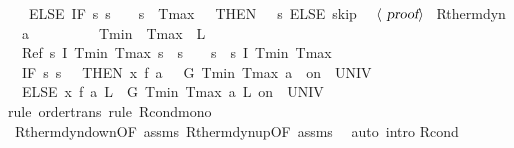 \documentclass[envcountsame,envcountsect]{llncs}
\begin{document}
\begin{example}
\begin{isabellebody}
\ \ \ ELSE\ IF\ {\isacharparenleft}{\isasymlambda}s{\isachardot}\ s{\isachardollar}{}\ {\isacharequal}\ {}\ {\isasymand}\ s{\isachardollar}{}\ {\isasymge}\ Tmax\ {\isacharminus}\ {}{\isacharparenright}\ THEN\ {\isacharparenleft}{}\ {\isacharcolon}{\isacharcolon}{\isacharequal}\ {\isacharparenleft}{\isasymlambda}s{\isachardot}{}{\isacharparenright}{\isacharparenright}\ ELSE\ skip{\isacharparenright}{\isachardoublequoteclose}\isanewline
\ \ $\langle \isa{proof}\rangle$\isanewline
\isanewline
{}\isamarkupfalse%
\ R{\isacharunderscore}therm{\isacharunderscore}dyn{\isacharcolon}\isanewline
\ \ {\isachardoublequoteopen}a\ {\isachargreater}\ {}{\isachardoublequoteclose}\ \ {\isachardoublequoteopen}{}\ {\isasymle}\ {\isasymtau}{\isachardoublequoteclose}\ \ {\isachardoublequoteopen}{}\ {\isacharless}\ Tmin{\isachardoublequoteclose}\ \ {\isachardoublequoteopen}Tmax\ {\isacharless}\ L{\isachardoublequoteclose}\isanewline
\ \ {\isachardoublequoteopen}Ref\ {\isasymlceil}{\isasymlambda}s{\isachardot}\ I\ Tmin\ Tmax\ s\ {\isasymand}\ s{\isachardollar}{}\ {\isacharequal}\ {}\ {\isasymand}\ s{\isachardollar}{}\ {\isacharequal}\ s{\isachardollar}{}{\isasymrceil}\ {\isasymlceil}I\ Tmin\ Tmax{\isasymrceil}\ {\isasymge}\ \isanewline
\ \ {\isacharparenleft}IF\ {\isacharparenleft}{\isasymlambda}s{\isachardot}\ s{\isachardollar}{}\ {\isacharequal}\ {}{\isacharparenright}\ THEN\ {\isacharparenleft}x{\isasymacute}{\isacharequal}\ f\ a\ {}\ {\isacharampersand}\ G\ Tmin\ Tmax\ a\ {}\ on\ {\isacharbraceleft}{}{\isachardot}{\isachardot}{\isasymtau}{\isacharbraceright}\ UNIV\ {\isacharat}\ {}{\isacharparenright}\ \isanewline
\ \ ELSE\ {\isacharparenleft}x{\isasymacute}{\isacharequal}\ f\ a\ L\ {\isacharampersand}\ G\ Tmin\ Tmax\ a\ L\ on\ {\isacharbraceleft}{}{\isachardot}{\isachardot}{\isasymtau}{\isacharbraceright}\ UNIV\ {\isacharat}\ {}{\isacharparenright}{\isacharparenright}{\isachardoublequoteclose}\isanewline
\ \isamarkupfalse%
{\isacharparenleft}rule\ order{\isacharunderscore}trans{\isacharcomma}\ rule\ R{\isacharunderscore }cond{\isacharunderscore}mono{\isacharparenright}\isanewline
\ \isamarkupfalse%
\ R{\isacharunderscore}therm{\isacharunderscore}dyn{\isacharunderscore}down{\isacharbrackleft}OF\ assms{\isacharbrackright}\ R{\isacharunderscore}therm{\isacharunderscore}dyn{\isacharunderscore}up{\isacharbrackleft}OF\ assms{\isacharbrackright}\ \isamarkupfalse%
\ {\isacharparenleft}auto\ intro{\isacharcolon} R{\isacharunderscore}cond{\isacharparenright}\isanewline
\end{isabellebody}


\end{example}
\end{document}

